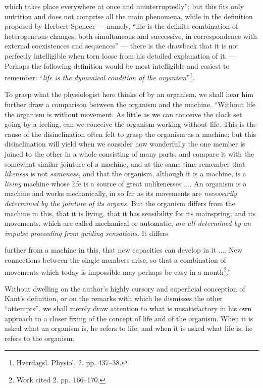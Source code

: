 \documentclass[12pt,a4paper]{book}
\begin{document}
\setcounter{footnote}{0}
which takes place everywhere at once and uninterruptedly''; but this fits only
nutrition and does not comprise all the main phenomena, while in the definition
proposed by Herbert Spencer --- namely, ``life is the definite combination of
heterogeneous changes, both simultaneous and successive, in correspondence with
external coexistences and sequences'' --- there is the drawback that it is not
perfectly intelligible when torn loose from his detailed explanation of it. ---
Perhaps the following definition would be most intelligible and easiest to
remember: ``\emph{life is the dynamical condition of the
organism}''\footnote{Hverdagsl. Physiol. 2. pp. 437--38.}.

To grasp what the physiologist here thinks of by an organism, we shall hear him
further draw a comparison between the organism and the machine. ``Without life the
organism is without movement. As little as we can conceive the clock set going by a
feeling, can we conceive the organism working without life. This is the cause of
the disinclination often felt to grasp the organism as a machine; but this
disinclination will yield when we consider how wonderfully the one member is joined
to the other in a whole consisting of many parts, and compare it with the somewhat
similar jointure of a machine, and at the same time remember that \emph{likeness} is
not \emph{sameness}, and that the organism, although it is a machine, is a
\emph{living} machine whose life is a source of great unlikenesses .... An organism
is a machine and works mechanically, in so far as its movements are
\emph{necessarily determined by the jointure of its organs.} But the organism
differs from the machine in this, that it is living, that it has sensibility for its
mainspring; and its movements, which are called mechanical or automatic, \emph{are
all determined by an impulse proceeding from guiding sensations.} It differs

\setcounter{footnote}{0}
further from a machine in this, that new capacities can develop in it .... New
connections between the single members arise, so that a combination of movements
which today is impossible may perhaps be easy in a
month\footnote{Work cited 2. pp. 166--170.}.''

Without dwelling on the author's highly cursory and superficial conception of
Kant's definition, or on the remarks with which he dismisses the other
``attempts'', we shall merely draw attention to what is unsatisfactory in his own
approach to a closer fixing of the concept of life and of the organism. When it is
asked what an organism is, he refers to life; and when it is asked what life is, he
refers to the organism.
\end{document}
